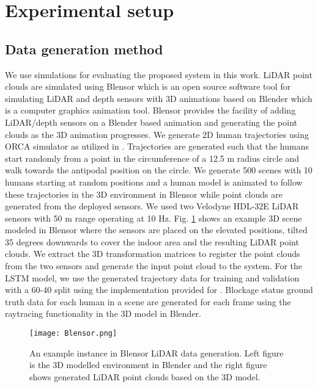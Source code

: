 \documentclass[conference]{IEEEtran}
\begin{document}
\section{Experimental setup}


\subsection{Data generation method}
We use simulations for evaluating the proposed system in this work. LiDAR point clouds are simulated using Blensor \cite{blensor} which is an open source software tool for simulating LiDAR and depth sensors with 3D animations based on Blender \cite{blender} which is a computer graphics animation tool. Blensor provides the facility of adding LiDAR/depth sensors on a Blender based animation and generating the point clouds as the 3D animation progresses. We generate 2D human trajectories using ORCA simulator \cite{orca} as utilized in \cite{trajnet}. Trajectories are generated such that the humans start randomly from a point in the circumference of a 12.5 m radius circle and walk towards the antipodal position on the circle. We generate 500 scenes with 10 humans starting at random positions and a human model is animated to follow these trajectories in the 3D environment in Blensor while point clouds are generated from the deployed sensors. We used two Velodyne HDL-32E LiDAR sensors with 50 m range operating at 10 Hz. Fig. \ref{fig:blensor} shows an example 3D scene modeled in Blensor where the sensors are placed on the elevated positions, tilted 35 degrees downwards to cover the indoor area and the resulting LiDAR point clouds. We extract the 3D transformation matrices to register the point clouds from the two sensors and generate the input point cloud to the system. For the LSTM model, we use the generated trajectory data for training and validation with a 60-40 split using the implementation provided for \cite{trajnet}. Blockage status ground truth data for each human in a scene are generated for each frame using the raytracing functionality in the 3D model in Blender. 

\begin{figure}[ht]
    \centering
    \texttt{[image: Blensor.png]}
    \caption{An example instance in Blensor LiDAR data generation. Left figure is the 3D modelled environment in Blender and the right figure shows generated LiDAR point clouds based on the 3D model.}
    \label{fig:blensor}
\end{figure}
\end{document}
